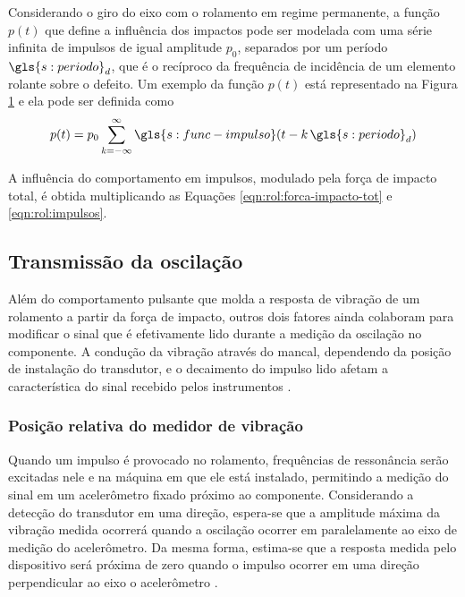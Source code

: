 \documentclass[12pt,oneside,english,brazil,lmodern,siglas,simbolos,cite=num]{ucsmonograph}
\begin{document}
	Considerando o giro do eixo com o rolamento em regime permanente, a função $ p(t) $ que define a influência dos impactos pode ser modelada com uma série infinita de impulsos de igual amplitude $ p_0 $, separados por um período $ \gls{s:periodo}_d $, que é o recíproco da frequência de incidência de um elemento rolante sobre o defeito.
	Um exemplo da função $ p(t) $ está representado na Figura \ref{fig:funcao-impulso} e ela pode ser definida como \cite{mcfadden:1984}
	\begin{equation} \label{eqn:rol:impulsos}
		p(t) = p_0\sum_{k=-\infty}^{\infty}\gls{s:func-impulso}(t-k\,\gls{s:periodo}_d)
	\end{equation}
	\begin{figure}[b]
		\label{fig:funcao-impulso}
	\end{figure}

	A influência do comportamento em impulsos, modulado pela força de impacto total, é obtida multiplicando as Equações \ref{eqn:rol:forca-impacto-tot} e \ref{eqn:rol:impulsos}.
	
	\subsection{Transmissão da oscilação}
	Além do comportamento pulsante que molda a resposta de vibração de um rolamento a partir da força de impacto, outros dois fatores ainda colaboram para modificar o sinal que é efetivamente lido durante a medição da oscilação no componente.
	A condução da vibração através do mancal, dependendo da posição de instalação do transdutor, e o decaimento do impulso lido afetam a característica do sinal recebido pelos instrumentos \cite{mcfadden:1984}.
	
	\subsubsection{Posição relativa do medidor de vibração}
	Quando um impulso é provocado no rolamento, frequências de ressonância serão excitadas nele e na máquina em que ele está instalado, permitindo a medição do sinal em um acelerômetro fixado próximo ao componente.
	Considerando a detecção do transdutor em uma direção, espera-se que a amplitude máxima da vibração medida ocorrerá quando a oscilação ocorrer em paralelamente ao eixo de medição do acelerômetro.
	Da mesma forma, estima-se que a resposta medida pelo dispositivo será próxima de zero quando o impulso ocorrer em uma direção perpendicular ao eixo o acelerômetro \cite{mcfadden:1984}.
	
\end{document}
